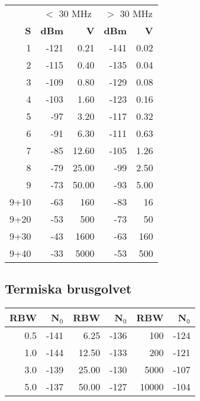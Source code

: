 \begin{center}
\begin{longtable}{r|rr|rr}
	     & \multicolumn{2}{c|}{$<$ 30 MHz} & \multicolumn{2}{c}{$>$ 30 MHz} \\ 
	   \textbf{S} &  \textbf{dBm} &                \textbf{\textmu V} &  \textbf{dBm} &               \textbf{\textmu V} \\ \hline \endhead
	   1 & -121 &                     0.21 & -141 &                    0.02 \\
	   2 & -115 &                     0.40 & -135 &                    0.04 \\
	   3 & -109 &                     0.80 & -129 &                    0.08 \\
	   4 & -103 &                     1.60 & -123 &                    0.16 \\
	   5 &  -97 &                     3.20 & -117 &                    0.32 \\
	   6 &  -91 &                     6.30 & -111 &                    0.63 \\
	   7 &  -85 &                    12.60 & -105 &                    1.26 \\
	   8 &  -79 &                    25.00 &  -99 &                    2.50 \\
	   9 &  -73 &                    50.00 &  -93 &                    5.00 \\
	9+10 &  -63 &                      160 &  -83 &                      16 \\
	9+20 &  -53 &                      500 &  -73 &                      50 \\
	9+30 &  -43 &                     1600 &  -63 &                     160 \\
	9+40 &  -33 &                     5000 &  -53 &                     500
\end{longtable}
\end{center}
\subsection{Termiska brusgolvet}

\begin{center}
\begin{tabular}{rr|rr|rr}
	\textbf{RBW} & \textbf{N$_0$} & \textbf{RBW} & \textbf{N$_0$} & \textbf{RBW} & \textbf{N$_0$} \\ \hline
	         0.5 &           -141 &         6.25 &           -136 &          100 &           -124 \\
	         1.0 &           -144 &        12.50 &           -133 &          200 &           -121 \\
	         3.0 &           -139 &        25.00 &           -130 &         5000 &           -107 \\
	         5.0 &           -137 &        50.00 &           -127 &        10000 &           -104
\end{tabular}
\end{center}


